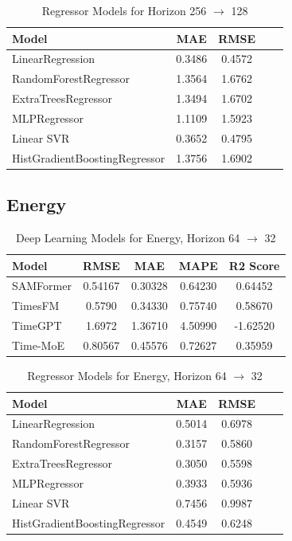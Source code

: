\begin{table}[h!]
\centering
\begin{tabular}{lcccc}
\hline
Model & MAE & RMSE \\
\hline
LinearRegression              & 0.3486 & 0.4572 \\
RandomForestRegressor         & 1.3564 & 1.6762 \\
ExtraTreesRegressor           & 1.3494 & 1.6702 \\
MLPRegressor                  & 1.1109 & 1.5923 \\
Linear SVR                    & 0.3652 & 0.4795 \\
HistGradientBoostingRegressor & 1.3756 & 1.6902 \\
\hline
\end{tabular}
\caption{Regressor Models for Horizon 256 \texorpdfstring{$\to$}{->} 128}
\label{tab:finance_256to128_reg}
\end{table}
\subsection{Energy}

\begin{table}[h!]
\centering
\begin{tabular}{lcccc}
\hline
Model & RMSE & MAE & MAPE & R2 Score \\
\hline
SAMFormer   & 0.54167 & 0.30328 & 0.64230 & 0.64452 \\
TimesFM     & 0.5790  & 0.34330 & 0.75740 & 0.58670 \\
TimeGPT     & 1.6972  & 1.36710 & 4.50990 & -1.62520 \\
Time-MoE    & 0.80567 & 0.45576 & 0.72627 & 0.35959 \\
\hline
\end{tabular}
\caption{Deep Learning Models for Energy, Horizon 64 \texorpdfstring{$\to$}{->} 32}
\label{tab:energy_64to32_dl}
\end{table}

\begin{table}[h!]
\centering
\begin{tabular}{lcccc}
\hline
Model & MAE & RMSE \\\hline
LinearRegression              & 0.5014 & 0.6978 \\
RandomForestRegressor         & 0.3157 & 0.5860 \\
ExtraTreesRegressor           & 0.3050 & 0.5598 \\
MLPRegressor                  & 0.3933 & 0.5936 \\
Linear SVR                    & 0.7456 & 0.9987 \\
HistGradientBoostingRegressor & 0.4549 & 0.6248 \\
\hline
\end{tabular}
\caption{Regressor Models for Energy, Horizon 64 \texorpdfstring{$\to$}{->} 32}
\label{tab:energy_64to32_reg}
\end{table}

